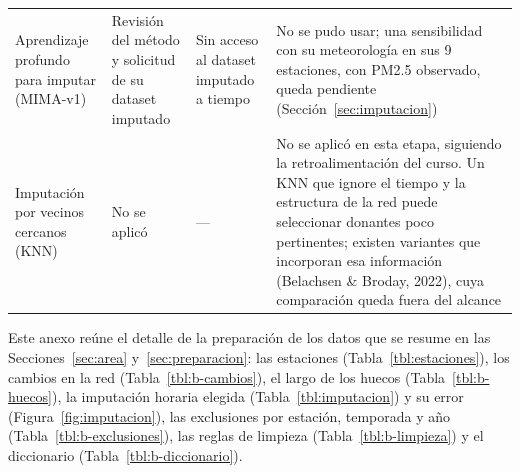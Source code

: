 \begin{table}[H]
\begin{tabularx}{\textwidth}{>{\raggedright\arraybackslash}p{3.0cm}>{\raggedright\arraybackslash}p{3.4cm}>{\raggedright\arraybackslash}p{3.8cm}L}
Aprendizaje profundo para imputar (MIMA-v1) & Revisión del método y solicitud de su dataset imputado & Sin acceso al dataset imputado a tiempo & No se pudo usar; una sensibilidad con su meteorología en sus 9 estaciones, con PM2.5 observado, queda pendiente (Sección~\ref{sec:imputacion})\\
Imputación por vecinos cercanos (KNN) & No se aplicó & — & No se aplicó en esta etapa, siguiendo la retroalimentación del curso. Un KNN que ignore el tiempo y la estructura de la red puede seleccionar donantes poco pertinentes; existen variantes que incorporan esa información (Belachsen \& Broday, 2022), cuya comparación queda fuera del alcance\\
\bottomrule
\end{tabularx}
\end{table}

Este anexo reúne el detalle de la preparación de los datos que se resume en las Secciones~\ref{sec:area} y~\ref{sec:preparacion}: las estaciones (Tabla~\ref{tbl:estaciones}), los cambios en la red (Tabla~\ref{tbl:b-cambios}), el largo de los huecos (Tabla~\ref{tbl:b-huecos}), la imputación horaria elegida (Tabla~\ref{tbl:imputacion}) y su error (Figura~\ref{fig:imputacion}), las exclusiones por estación, temporada y año (Tabla~\ref{tbl:b-exclusiones}), las reglas de limpieza (Tabla~\ref{tbl:b-limpieza}) y el diccionario (Tabla~\ref{tbl:b-diccionario}).

